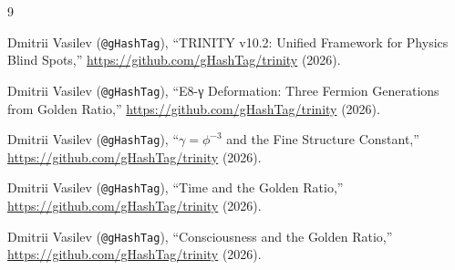 \documentclass[12pt,a4paper]{article}
\begin{document}
\begin{thebibliography}{9}

Dmitrii Vasilev (\texttt{@gHashTag}),
``TRINITY v10.2: Unified Framework for Physics Blind Spots,''
\url{https://github.com/gHashTag/trinity} (2026).

Dmitrii Vasilev (\texttt{@gHashTag}),
``E8-γ Deformation: Three Fermion Generations from Golden Ratio,''
\url{https://github.com/gHashTag/trinity} (2026).

Dmitrii Vasilev (\texttt{@gHashTag}),
``$\gamma = \phi^{-3}$ and the Fine Structure Constant,''
\url{https://github.com/gHashTag/trinity} (2026).

Dmitrii Vasilev (\texttt{@gHashTag}),
``Time and the Golden Ratio,''
\url{https://github.com/gHashTag/trinity} (2026).

Dmitrii Vasilev (\texttt{@gHashTag}),
``Consciousness and the Golden Ratio,''
\url{https://github.com/gHashTag/trinity} (2026).

\end{thebibliography}
\end{document}
